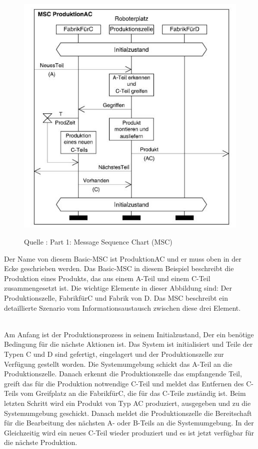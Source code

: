 \begin{center}
\begin{figure}[h]
   

\includegraphics[scale=1]{Graphics/MSC1.jpg}



Quelle : \cite{MT009}
Part 1: Message Sequence Chart (MSC) 

 
\label{fig7}


\end{figure}

\end{center}
\newpage
Der Name von diesem Basic-MSC ist ProduktionAC und er muss oben in der Ecke geschrieben werden. Das Basic-MSC in diesem Beispiel beschreibt die Produktion eines Produkts, das aus einem A-Teil und einem C-Teil zusammengesetzt ist.
Die wichtige Elemente in dieser Abbildung sind: Der Produktionszelle, FabrikfürC und Fabrik von D. Das MSC beschreibt ein detaillierte Szenario vom Informationsaustausch zwischen diese drei Element. 

\\
Am Anfang ist der Produktionsprozess in seinem Initialzustand, Der ein benötige Bedingung für die nächste Aktionen ist. 
 Das System ist initialisiert und Teile
der Typen C und D sind gefertigt, eingelagert und der
Produktionszelle zur Verfügung gestellt worden.
 Die Systemumgebung schickt das A-Teil an die Produktionszelle.
 Danach erkennt die Produktionszelle das empfangende Teil, greift das für die Produktion notwendige C-Teil und meldet das Entfernen des
 C-Teils vom Greifplatz an die FabrikfürC, die für das C-Teile zuständig ist. 
 Beim letzten Schritt wird ein Produkt von Typ AC produziert, ausgegeben und zu die Systemumgebung geschickt.
Danach meldet die Produktionszelle die Bereitschaft
für die Bearbeitung des nächsten A- oder B-Teils
an die Systemumgebung.
In der Gleichzeitig wird ein neues C-Teil wieder produziert und es ist jetzt verfügbar für die nächste Produktion.

